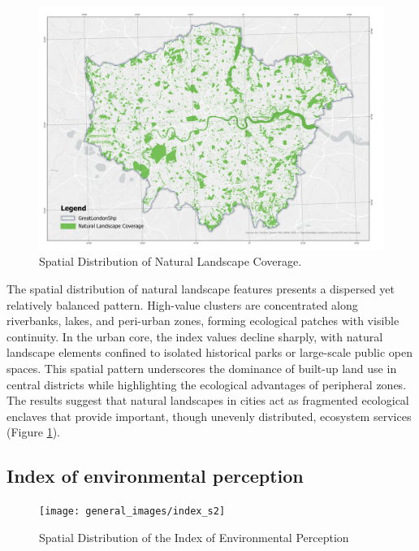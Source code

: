 \documentclass[
  12pt,
  oneside]{book}
\begin{document}
\begin{figure}

{\centering \includegraphics[width=1\linewidth]{general_images/nf} 

}

\caption{Spatial Distribution of Natural Landscape Coverage.}\label{fig:nf}
\end{figure}

The spatial distribution of natural landscape features presents a dispersed yet relatively balanced pattern. High-value clusters are concentrated along riverbanks, lakes, and peri-urban zones, forming ecological patches with visible continuity. In the urban core, the index values decline sharply, with natural landscape elements confined to isolated historical parks or large-scale public open spaces. This spatial pattern underscores the dominance of built-up land use in central districts while highlighting the ecological advantages of peripheral zones. The results suggest that natural landscapes in cities act as fragmented ecological enclaves that provide important, though unevenly distributed, ecosystem services (Figure \ref{fig:nf}).

\subsection{Index of environmental perception}\label{index-of-environmental-perception}

\begin{figure}

{\centering \texttt{[image: general\_images/index\_s2]} 

}

\caption{Spatial Distribution of the Index of Environmental Perception}\label{fig:indexs2}
\end{figure}
\end{document}
